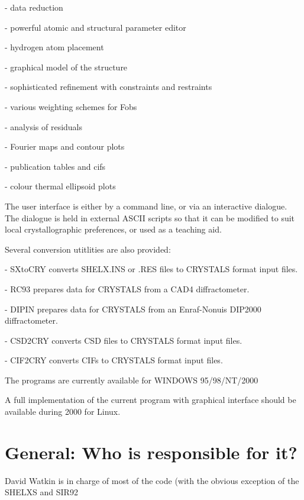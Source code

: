 \documentclass[10pt,a4paper]{report}
\begin{document}
- data reduction


- powerful atomic and structural parameter editor


- hydrogen atom placement


- graphical model of the structure


- sophisticated refinement with constraints and restraints


- various weighting schemes for Fobs


- analysis of residuals


- Fourier maps and contour plots


- publication tables and cifs


- colour thermal ellipsoid plots







The user interface is either by a command line, or via an interactive dialogue.
The dialogue is held in external ASCII scripts so that it can be modified to suit local
crystallographic preferences, or used as a teaching aid.



Several conversion utitlities are also provided:





- SXtoCRY converts SHELX.INS or .RES files to CRYSTALS format input files.


- RC93 prepares data for CRYSTALS from a CAD4 diffractometer.


- DIPIN prepares data for CRYSTALS from an Enraf-Nonuis DIP2000 diffractometer.


- CSD2CRY converts CSD files to CRYSTALS format input files.


- CIF2CRY converts CIFs to CRYSTALS format input files.





The programs are currently available for WINDOWS 95/98/NT/2000


A full implementation of the current program with graphical interface
should be available during  2000 for Linux.

\section{General: Who is responsible for it?}


David Watkin is in charge of most of the code (with the
obvious exception of the SHELXS and SIR92
\end{document}
